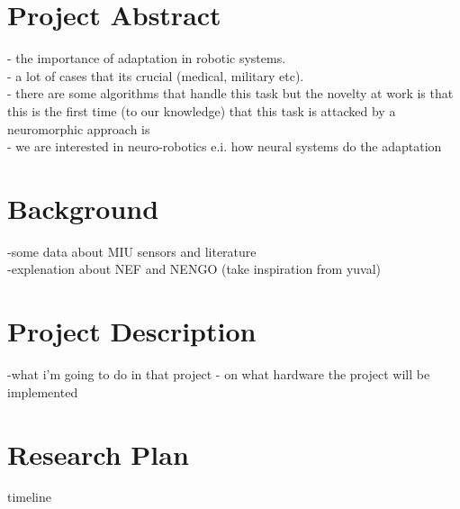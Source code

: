 \documentclass{article}
\begin{document}
\section{Project Abstract}

- the importance  of adaptation in robotic systems.
\\- a lot of cases that its crucial (medical, military etc). 
\\- there are some algorithms that handle this task but the novelty at work is that this is the first time (to our knowledge) that this task is attacked    by a neuromorphic approach is
\\- we are interested in neuro-robotics e.i. how neural systems do the adaptation

\section{Background}

-some data about MIU sensors and literature
\\-explenation about NEF and NENGO (take inspiration from yuval)
\\
\section{Project Description}

-what i'm going to do in that project
- on what hardware the project will be implemented
\\
\section{Research Plan}

timeline
\\
\end{document}
